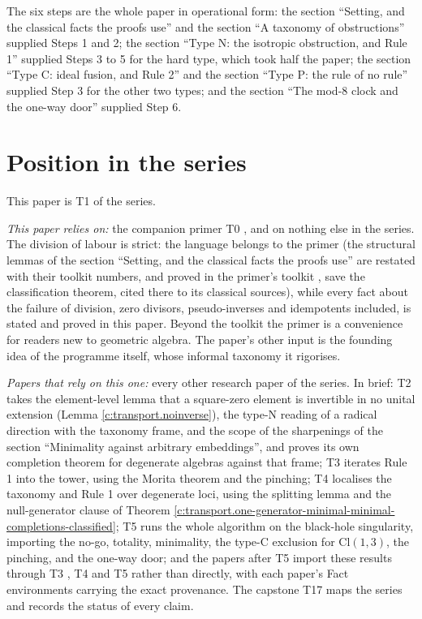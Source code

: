 \documentclass[11pt]{article}
\theoremstyle{definition}
\theoremstyle{plain}
\providecommand{\Cl}{}\renewcommand{\Cl}{\mathrm{Cl}}
\begin{document}
\label{c:note.transport.setting-transport-algorithm-2}
The six steps are the whole paper in operational form: the section ``Setting, and the classical facts the proofs use'' and the section ``A taxonomy of obstructions'' supplied Steps 1 and 2; the section ``Type N: the isotropic obstruction, and Rule 1'' supplied Steps 3 to 5 for the hard type, which took half the paper; the section ``Type C: ideal fusion, and Rule 2'' and the section ``Type P: the rule of no rule'' supplied Step 3 for the other two types; and the section ``The mod-8 clock and the one-way door'' supplied Step 6.

\section{Position in the series}

\label{c:note.transport.setting-position-series}
This paper is T1 of the series.

\emph{This paper relies on:} the companion primer T0 \cite{ButlerT0}, and on nothing else in the series. The division of labour is strict: the language belongs to the primer (the structural lemmas of the section ``Setting, and the classical facts the proofs use'' are restated with their toolkit numbers, and proved in the primer's toolkit \cite[Section 9]{ButlerT0}, save the classification theorem, cited there to its classical sources), while every fact about the failure of division, zero divisors, pseudo-inverses and idempotents included, is stated and proved in this paper. Beyond the toolkit the primer is a convenience for readers new to geometric algebra. The paper's other input is the founding idea of the programme itself, whose informal taxonomy it rigorises.

\emph{Papers that rely on this one:} every other research paper of the series. In brief: T2 \cite{ButlerT2} takes the element-level lemma that a square-zero element is invertible in no unital extension (Lemma \ref{c:transport.noinverse}), the type-N reading of a radical direction with the taxonomy frame, and the scope of the sharpenings of the section ``Minimality against arbitrary embeddings'', and proves its own completion theorem for degenerate algebras against that frame; T3 \cite{ButlerT3} iterates Rule 1 into the tower, using the Morita theorem and the pinching; T4 \cite{ButlerT4} localises the taxonomy and Rule 1 over degenerate loci, using the splitting lemma and the null-generator clause of Theorem \ref{c:transport.one-generator-minimal-minimal-completions-classified}; T5 \cite{ButlerT5} runs the whole algorithm on the black-hole singularity, importing the no-go, totality, minimality, the type-C exclusion for $\Cl(1,3)$, the pinching, and the one-way door; and the papers after T5 \cite{ButlerT5} import these results through T3 \cite{ButlerT3}, T4 \cite{ButlerT4} and T5 \cite{ButlerT5} rather than directly, with each paper's Fact environments carrying the exact provenance. The capstone T17 \cite{ButlerT17} maps the series and records the status of every claim.
\end{document}
